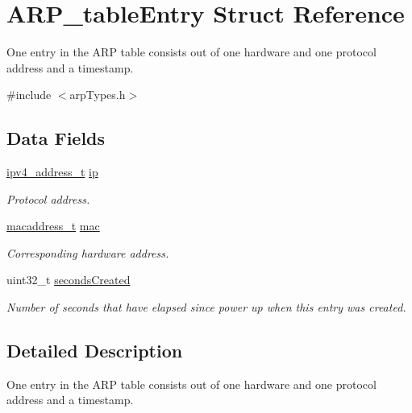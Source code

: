 \hypertarget{struct_a_r_p__table_entry}{}\section{A\+R\+P\+\_\+table\+Entry Struct Reference}
\label{struct_a_r_p__table_entry}


One entry in the A\+RP table consists out of one hardware and one protocol address and a timestamp.  




{\ttfamily \#include $<$arp\+Types.\+h$>$}

\subsection*{Data Fields}
\begin{DoxyCompactItemize}
\item 
\mbox{\hyperlink{group__ipv4_gad9df0882950e70d0587a4b423beb261a}{ipv4\+\_\+address\+\_\+t}} \mbox{\hyperlink{struct_a_r_p__table_entry_a8788f788aa5f4c53d49e312f6589769a}{ip}}
\begin{DoxyCompactList}\small\item\em Protocol address. \end{DoxyCompactList}\item 
\mbox{\hyperlink{group__ethernet_gacb865bcbf50a6c8cef05581bfabff373}{macaddress\+\_\+t}} \mbox{\hyperlink{struct_a_r_p__table_entry_a815eb066061f1dd9afdb6c6eee48f46e}{mac}}
\begin{DoxyCompactList}\small\item\em Corresponding hardware address. \end{DoxyCompactList}\item 
uint32\+\_\+t \mbox{\hyperlink{struct_a_r_p__table_entry_a06c3d88e59b26905ae3d434ff0b6e23e}{seconds\+Created}}
\begin{DoxyCompactList}\small\item\em Number of seconds that have elapsed since power up when this entry was created. \end{DoxyCompactList}\end{DoxyCompactItemize}


\subsection{Detailed Description}
One entry in the A\+RP table consists out of one hardware and one protocol address and a timestamp. 

